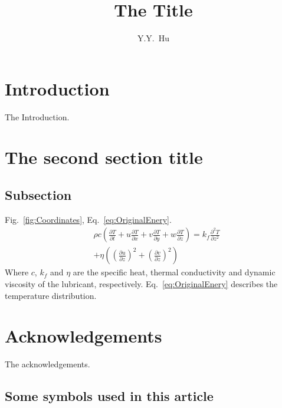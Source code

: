 \documentclass{article}
\title{The Title}
\author{Y.Y.~Hu}
\begin{document}

\maketitle

\section{Introduction}

The Introduction. 

\section{The second section title}
\subsection{Subsection}
Fig.~\ref{fig:Coordinates}, Eq.~\eqref{eq:OriginalEnery}.
\begin{align} \label{eq:OriginalEnery}
	& \rho c \left( \frac{\partial T}{\partial t} + u\frac{\partial T}{\partial x} + v\frac{\partial T}{\partial y} + w\frac{\partial T}{\partial z} \right) = k_f \frac{\partial^2 T}{\partial z^2} \nonumber \\
	&+ \eta\left( \left(\frac{\partial u}{\partial z}\right)^2 + \left( \frac{\partial v}{\partial z} \right)^2 \right)
\end{align}
Where $c$, $k_f$ and $\eta$ are the specific heat, thermal conductivity and dynamic viscosity of the lubricant, respectively. Eq.~\eqref{eq:OriginalEnery} describes the temperature distribution. 

\section*{Acknowledgements}
The acknowledgements.




\begin{appendices}

\section{Some symbols used in this article}

\end{appendices}
\end{document}
